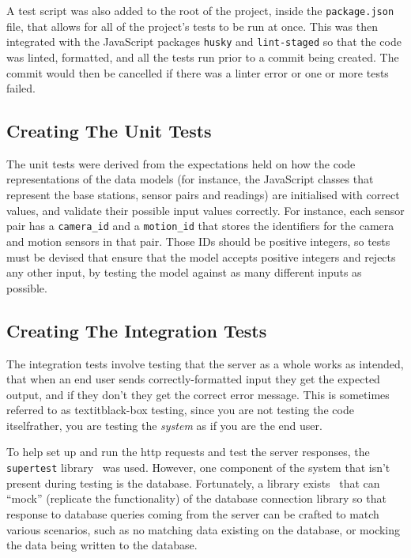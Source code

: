 A test script was also added to the root of the project, inside the
\texttt{package.json} file, that allows for all of the project's tests to be
run at once. This was then integrated with the JavaScript packages
\texttt{husky} and \texttt{lint-staged} so that the code was linted,
formatted, and all the tests run prior to a commit being created. The commit
would then be cancelled if there was a linter error or one or more tests failed.

\subsection{Creating The Unit Tests}
The unit tests were derived from the expectations held on how the code
representations of the data models (for instance, the JavaScript classes that
represent the base stations, sensor pairs and readings) are initialised with
correct values, and validate their possible input values correctly. For
instance, each sensor pair has a \texttt{camera\_id} and a
\texttt{motion\_id} that stores the identifiers for the camera and motion
sensors in that pair. Those IDs should be positive integers, so tests must be
devised that ensure that the model accepts positive integers and rejects any
other input, by testing the model against as many different inputs as
possible.

\subsection{Creating The Integration Tests}

The integration tests involve testing that the server as a whole works as
intended, that when an end user sends correctly-formatted input they get the
expected output, and if they don't they get the correct error message. This
is sometimes referred to as textit{black-box testing}, since you are not
testing the code itself\textemdash{}rather, you are testing the
\textit{system} as if you are the end user.

To help set up and run the \acrshort{http} requests and test the server
responses, the \texttt{supertest} library~\cite{supertest} was used. However,
one component of the system that isn't present during testing is the
database. Fortunately, a library exists~\cite{mock-knex} that can ``mock''
(replicate the functionality) of the database connection library so that
response to database queries coming from the server can be crafted to match
various scenarios, such as no matching data existing on the database, or
mocking the data being written to the database.

